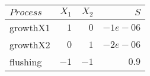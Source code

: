   \begin{tabular}{lrrr}\hline
    $Process$ & $X_1$ & $X_2$ & $S$ \\ \hline
    growthX1 & $1$ & $0$ & $-1e-06$ \\
    growthX2 & $0$ & $1$ & $-2e-06$ \\
    flushing & $-1$ & $-1$ & $0.9$ \\ \hline
  \end{tabular}

